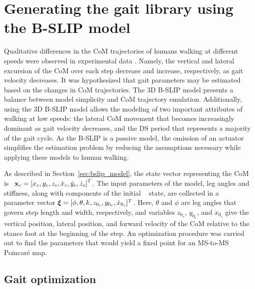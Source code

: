 \section{Generating the gait library using the B-SLIP model} \label{sec:gait_opt}

Qualitative differences in the CoM trajectories of humans walking at different speeds were observed in experimental data \cite{fukuchi2018public}. Namely, the vertical and lateral excursion of the CoM over each step decrease and increase, respectively, as gait velocity decreases. It was hypothesized that gait parameters may be estimated based on the changes in CoM trajectories. The 3D B-SLIP model presents a balance between model simplicity and CoM trajectory emulation. Additionally, using the 3D B-SLIP model allows the modeling of two important attributes of walking at low speeds: the lateral CoM movement that becomes increasingly dominant as gait velocity decreases, and the DS period that represents a majority of the gait cycle. As the B-SLIP is a passive model, the omission of an actuator simplifies the estimation problem by reducing the assumptions necessary while applying these models to human walking. 

As described in Section~\ref{sec:bslip_model}, the state vector representing the CoM is \mbox{ $\mathbf{x}_{c} = \left[x_{c} ,y_{c} ,z_{c} ,\dot{x}_{c} ,\dot{y}_{c} ,\dot{z}_{c}\right]^T $}. The input parameters of the model, leg angles and stiffness, along with components of the initial \com~ state, are collected in a parameter vector $\boldsymbol{\xi} = [\phi, \theta ,k ,z_{0_{c}} ,y_{0_{c}} ,\dot{x}_{0_{c}}]^T$. Here, $ \theta $ and $ \phi $ are leg angles that govern step length and width, respectively, and variables $ z_{0_{c}}$, $y_{0_{c}}$, and $\dot{x}_{0_{c}} $ give the vertical position, lateral position, and forward velocity of the CoM relative to the stance foot at the beginning of the step. An optimization procedure was carried out to find the parameters that would yield a fixed point for an MS-to-MS Poincar\'e map.

\subsection{Gait optimization}
%	

